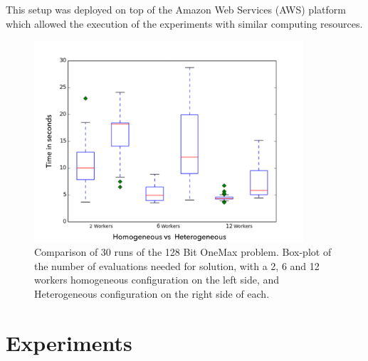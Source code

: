 \documentclass{llncs}
\begin{document}
This setup was deployed on top of the Amazon Web Services (AWS)
platform which allowed the execution of the experiments with similar computing resources.  

\begin{figure}[h!t]
    \centering
        \includegraphics[width=10cm]{img/one_max_comp.png}
    \caption{Comparison of 30 runs of the 128 Bit OneMax problem. 
    Box-plot of the number of evaluations needed for solution, with a 2, 6 and 12 workers
    homogeneous configuration on the left side, and Heterogeneous configuration on the
    right side of each.
    }
    \label{fig:comp-onemax}
\end{figure}

\section{Experiments}
 \label{sec:experiments}
\end{document}
